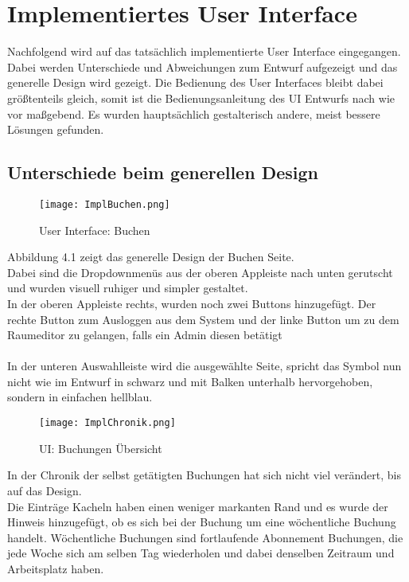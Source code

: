 \chapter{Implementiertes User Interface}
Nachfolgend wird auf das tatsächlich implementierte User Interface eingegangen.
Dabei werden Unterschiede und Abweichungen zum Entwurf aufgezeigt und das generelle Design wird gezeigt.
Die Bedienung des User Interfaces bleibt dabei größtenteils gleich, somit ist die Bedienungsanleitung des UI Entwurfs nach wie vor maßgebend.
Es wurden hauptsächlich gestalterisch andere, meist bessere Lösungen gefunden.

\section{Unterschiede beim generellen Design}

\begin{wrapfigure}[15]{r}{5.5cm}
  \texttt{[image: ImplBuchen.png]}
  \caption{User Interface: Buchen}
\end{wrapfigure}

Abbildung 4.1 zeigt das generelle Design der Buchen Seite.
\\
Dabei sind die Dropdownmenüs aus der oberen Appleiste nach unten gerutscht und wurden visuell ruhiger und simpler gestaltet.
\\
In der oberen Appleiste rechts, wurden noch zwei Buttons hinzugefügt. Der rechte Button zum Ausloggen aus dem System und der linke Button um zu dem Raumeditor zu gelangen, falls ein Admin diesen betätigt
\\\\
In der unteren Auswahlleiste wird die ausgewählte Seite, spricht das Symbol nun nicht wie im Entwurf in schwarz und mit Balken unterhalb hervorgehoben, sondern in einfachen hellblau.

\newpage

\begin{wrapfigure}[14]{r}{5.5cm}
  \texttt{[image: ImplChronik.png]}
  \caption{UI: Buchungen Übersicht}
\end{wrapfigure}

In der Chronik der selbst getätigten Buchungen hat sich nicht viel verändert, bis auf das Design.
\\
Die Einträge Kacheln haben einen weniger markanten Rand und es wurde der Hinweis hinzugefügt, ob es sich bei der Buchung um eine wöchentliche Buchung handelt.
Wöchentliche Buchungen sind fortlaufende Abonnement Buchungen, die jede Woche sich am selben Tag wiederholen und dabei denselben Zeitraum und Arbeitsplatz haben.
